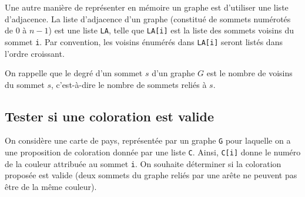 Une autre manière de représenter en mémoire un graphe est d'utiliser une liste d'adjacence. La liste d'adjacence d'un graphe (constitué de sommets numérotés de 0 à $n-1$) est une liste \lstinline{LA}, telle que \lstinline{LA[i]} est la liste des sommets voisins du sommet \lstinline{i}. Par convention, les voisins énumérés dans \lstinline{LA[i]} seront listés dans l'ordre croissant.

\ifprof
\begin{corrige}

\end{corrige}
\else
\fi

\ifprof
\begin{corrige}

\end{corrige}
\else
\fi

On rappelle que le degré d'un sommet $s$ d'un graphe $G$ est le nombre de voisins du sommet $s$, c'est-à-dire le nombre de sommets reliés à $s$.

\ifprof
\begin{corrige}

\end{corrige}
\else
\fi

\subsection{Tester si une coloration est valide}

\ifprof
\begin{corrige}

\end{corrige}
\else
\fi

On considère une carte de pays, représentée par un graphe \lstinline{G} pour laquelle on a une proposition de coloration donnée par une liste \lstinline{C}. Ainsi, \lstinline{C[i]} donne le numéro de la couleur attribuée au sommet \lstinline{i}. On souhaite déterminer si la coloration proposée est valide (deux sommets du graphe reliés par une arête ne peuvent pas être de la même couleur).

